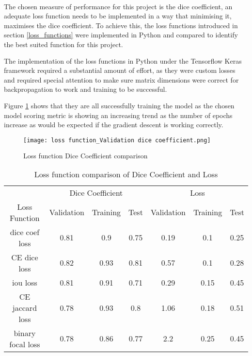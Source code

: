 \paragraph{}
The chosen measure of performance for this project is the dice coefficient, an adequate loss function needs to be implemented in a way that minimising it, maximises the dice coefficient. To achieve this, the loss functions introduced in section \ref{loss_functions} were implemented in Python and compared to identify the best suited function for this project.

The implementation of the loss functions in Python under the Tensorflow Keras framework required a substantial amount of effort, as they were custom losses and required special attention to make sure matrix dimensions were correct for backpropagation to work and training to be successful. 

Figure \ref{loss_dice} shows that they are all successfully training the model as the chosen model scoring metric is showing an increasing trend as the number of epochs increase as would be expected if the gradient descent is working correctly.

\begin{figure}[hbt!]
    \centering
    \texttt{[image: loss function\_Validation dice coefficient.png]}
    \caption{Loss function Dice Coefficient comparison}
    \label{loss_dice}
\end{figure}

\begin{table}[ht!] 
    \begin{center}
    \begin{tabular}{ccccccc} 
    \toprule
       & \multicolumn{3}{c}{Dice Coefficient}     & \multicolumn{3}{c}{Loss} \\
    Loss Function & Validation & Training & Test & Validation    & Training & Test   \\ 
    \midrule
    dice coef loss & 0.81 & 0.9 & 0.75 & 0.19 & 0.1 & 0.25  \\ \rowcolor{lightgray} \gls{CE} dice loss & 0.82 & 0.93 & 0.81 & 0.57 & 0.1 & 0.28  \\ iou loss & 0.81 & 0.91 & 0.71 & 0.29 & 0.15 & 0.45  \\ \gls{CE} jaccard loss & 0.78 & 0.93 & 0.8 & 1.06 & 0.18 & 0.51  \\ binary focal loss & 0.78 & 0.86 & 0.77 & 2.2 & 0.25 & 0.45  \\
    \bottomrule
    \end{tabular}
  \end{center} 
  \caption{Loss function comparison of Dice Coefficient and Loss}\label{tab_loss}
\end{table}

